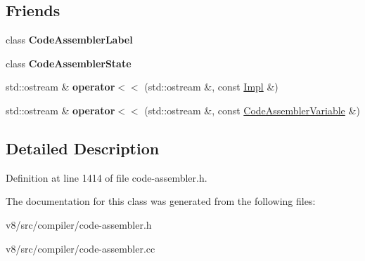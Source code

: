 \subsection*{Friends}
\begin{DoxyCompactItemize}
\item 
\mbox{\label{classv8_1_1internal_1_1compiler_1_1CodeAssemblerVariable_aca0848efaaf7dfe4a9f0e487a7aa6a41}} 
class {\bfseries Code\+Assembler\+Label}
\item 
\mbox{\label{classv8_1_1internal_1_1compiler_1_1CodeAssemblerVariable_a311a7059e1e78867144a638e52c03a12}} 
class {\bfseries Code\+Assembler\+State}
\item 
\mbox{\label{classv8_1_1internal_1_1compiler_1_1CodeAssemblerVariable_aec1cd68c1fc70fbe58022ea77ef1a6c3}} 
std\+::ostream \& {\bfseries operator$<$$<$} (std\+::ostream \&, const \mbox{\hyperlink{classv8_1_1internal_1_1compiler_1_1CodeAssemblerVariable_1_1Impl}{Impl}} \&)
\item 
\mbox{\label{classv8_1_1internal_1_1compiler_1_1CodeAssemblerVariable_a1f9dcfcba2851d6bb145cba7016b20f6}} 
std\+::ostream \& {\bfseries operator$<$$<$} (std\+::ostream \&, const \mbox{\hyperlink{classv8_1_1internal_1_1compiler_1_1CodeAssemblerVariable}{Code\+Assembler\+Variable}} \&)
\end{DoxyCompactItemize}


\subsection{Detailed Description}


Definition at line 1414 of file code-\/assembler.\+h.



The documentation for this class was generated from the following files\+:\begin{DoxyCompactItemize}
\item 
v8/src/compiler/code-\/assembler.\+h\item 
v8/src/compiler/code-\/assembler.\+cc\end{DoxyCompactItemize}
